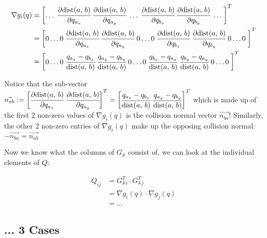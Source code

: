 \documentclass[12pt]{article}
\newcommand{\GA}{G_{\mathbb{A}}}
\newcommand{\pd}[2]{\cfrac{\partial{#1}}{\partial{#2}}}
\newcommand{\dist}[2]{\text{dist(} #1 \text{, } #2 \text{)}}
\begin{document}
\begin{align*}
    \nabla g_i(q)
        &= \begin{bmatrix}
            \dots \;
            \pd{\dist{a}{b}}{q_{a_x}} \; \pd{\dist{a}{b}}{q_{a_y}} \;
            \dots \;
            \pd{\dist{a}{b}}{q_{b_x}} \; \pd{\dist{a}{b}}{q_{b_y}} \;
            \dots \;
        \end{bmatrix}^T \\
        &= \begin{bmatrix}
            0 \dots  0 \;
            \pd{\dist{a}{b}}{q_{a_x}} \; \pd{\dist{a}{b}}{q_{a_y}} \;
            0 \dots 0 \;
            \pd{\dist{a}{b}}{q_{b_x}} \; \pd{\dist{a}{b}}{q_{b_y}} \;
            0 \dots 0 \;
        \end{bmatrix}^T \\
        &= \begin{bmatrix}
            0 \dots 0 \;
            \cfrac{q_{a_x} - q_{b_x}}{\dist{a}{b}} \; \cfrac{q_{a_y} - q_{b_y}}{\dist{a}{b}} \;
            0 \dots 0 \;
            \cfrac{q_{b_x} - q_{a_x}}{\dist{a}{b}} \; \cfrac{q_{b_y} - q_{a_y}}{\dist{a}{b}} \;
            0 \dots 0 \;
        \end{bmatrix}^T
\end{align*}

Notice that the sub-vector
$\vec{n_{ab}}
    := \begin{bmatrix}
        \pd{\dist{a}{b}}{q_{a_x}} \; \pd{\dist{a}{b}}{q_{a_y}}
    \end{bmatrix}^T
    = \begin{bmatrix}
        \cfrac{q_{a_x} - q_{b_x}}{\dist{a}{b}} \; \cfrac{q_{a_y} - q_{b_y}}{\dist{a}{b}}
    \end{bmatrix}^T$
which is made up of the first 2 non-zero values of $\nabla g_i(q)$
is the collision normal vector $\vec{n_{ba}}$!
Similarly, the other 2 non-zero entries of $\nabla g_i(q)$ make up the opposing 
collision normal: $-\vec{n_{ba}} = \vec{n_{ab}}$

Now we know what the columns of $\GA$ consist of, we can look at the individual elements of $Q$:

\begin{align*}
Q_{ij}
    &= \GA^T{_i} \cdot \GA^T{_j}\\
    &= \nabla g_i(q) \cdot \nabla g_j(q)\\
    &= ...
\end{align*}

\subsection*{... 3 Cases} 
\end{document}
